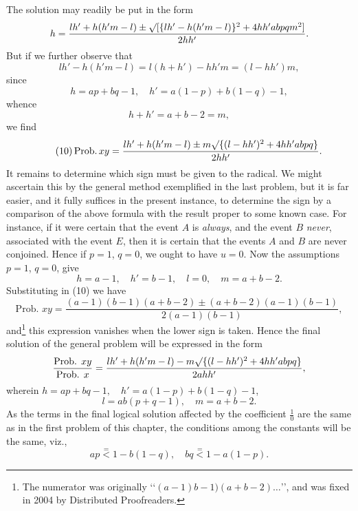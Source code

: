 \documentclass[oneside]{book}
\begin{document}
The solution may readily be put in the form
\begin{equation*}
h=\frac{lh'+h(h'm-l)\pm\surd[\{lh'-h(h'm-l)\}^2+4hh'abpqm^2]}{2hh'}.
\end{equation*}
But if we further observe that
\begin{equation*}
lh' - h (h'm -l) = l(h + h') - hh'm = (l - hh') m,
\end{equation*}
since
\begin{equation*}
h = ap + bq - 1, \quad h' = a (1 - p) + b (1 - q) - 1,
\end{equation*}
whence
\begin{equation*}
h+h'=a + b-2 = m,
\end{equation*}
we find
\begin{equation*}\tag{10}
\operatorname{Prob. } xy
= \frac{lh'+h(h'm-l)\pm m\surd\{(l-hh')^2+4hh'abpq\}}{2hh'}.
\end{equation*}
It remains to determine which sign must be given to the
radical. We might ascertain this by the general method exemplified
in the last problem, but it is far easier, and it fully suffices in the
present instance, to determine the sign by a comparison of the
above formula with the result proper to some known case. For
instance, if it were certain that the event $A$ is \emph{always}, and the
event $B$ \emph{never}, associated with the event $E$, then it is certain that
the events $A$ and $B$ are never conjoined. Hence if $p = 1$, $q = 0$,
we ought to have $u = 0$. Now the assumptions $p = 1$, $q = 0$,
give
\[
  h = a - 1,\quad h'= b - 1,\quad l = 0,\quad m = a + b - 2.
\]
Substituting in (10) we have
\[
  \text{Prob. }xy
 = \frac{(a-1)(b-1)(a+b-2) \pm (a + b - 2)(a-1)(b-1)}{2(a-1)(b-1)},
\]%
and\footnote{The numerator was originally \lq\lq$(a-1)b-1)(a+b-2)\dots$\rq\rq, and was fixed in 2004 by Distributed Proofreaders.
} this expression vanishes when the lower sign is taken.
Hence the final solution of the general problem will be expressed
in the form
\[
  \frac{\text{Prob. }xy}{\text{Prob. }x}
  = \frac{ lh' + h(h'm-l) - m\surd\{(l-hh')^2 + 4hh'abpq\} }{2ahh'},
\]
wherein $h = ap + bq - 1,\quad h' = a(1-p) + b(1-q) - 1$,
\[
  l = ab(p + q - 1),\quad m = a + b - 2.
\]
As the terms in the final logical solution affected by the coefficient $\frac{1}{0}$ are the same as in the first problem of this chapter,
the conditions among the constants will be the same, viz.,
\[
  ap \stackrel{=}{<} 1 - b(1-q),\quad bq \stackrel{=}{<} 1 - a(1-p).
\]
\end{document}
